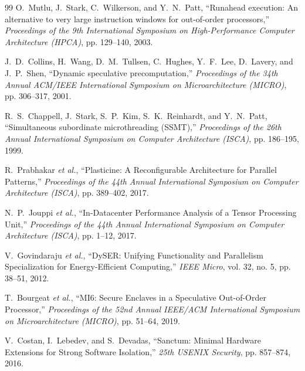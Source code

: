 \documentclass[twocolumn]{article}
\begin{document}
\begin{thebibliography}{99}
O.~Mutlu, J.~Stark, C.~Wilkerson, and Y.~N.~Patt,
``Runahead execution: An alternative to very large instruction windows for out-of-order processors,''
\emph{Proceedings of the 9th International Symposium on High-Performance Computer Architecture (HPCA)}, pp. 129--140, 2003.

J.~D.~Collins, H.~Wang, D.~M.~Tullsen, C.~Hughes, Y.~F.~Lee, D.~Lavery, and J.~P.~Shen,
``Dynamic speculative precomputation,''
\emph{Proceedings of the 34th Annual ACM/IEEE International Symposium on Microarchitecture (MICRO)}, pp. 306--317, 2001.

R.~S.~Chappell, J.~Stark, S.~P.~Kim, S.~K.~Reinhardt, and Y.~N.~Patt,
``Simultaneous subordinate microthreading (SSMT),''
\emph{Proceedings of the 26th Annual International Symposium on Computer Architecture (ISCA)}, pp. 186--195, 1999.

R.~Prabhakar \emph{et al.},
``Plasticine: A Reconfigurable Architecture for Parallel Patterns,''
\emph{Proceedings of the 44th Annual International Symposium on Computer Architecture (ISCA)}, pp. 389--402, 2017.

N.~P.~Jouppi \emph{et al.},
``In-Datacenter Performance Analysis of a Tensor Processing Unit,''
\emph{Proceedings of the 44th Annual International Symposium on Computer Architecture (ISCA)}, pp. 1--12, 2017.

V.~Govindaraju \emph{et al.},
``DySER: Unifying Functionality and Parallelism Specialization for Energy-Efficient Computing,''
\emph{IEEE Micro}, vol. 32, no. 5, pp. 38--51, 2012.

T.~Bourgeat \emph{et al.},
``MI6: Secure Enclaves in a Speculative Out-of-Order Processor,''
\emph{Proceedings of the 52nd Annual IEEE/ACM International Symposium on Microarchitecture (MICRO)}, pp. 51--64, 2019.

V.~Costan, I.~Lebedev, and S.~Devadas,
``Sanctum: Minimal Hardware Extensions for Strong Software Isolation,''
\emph{25th USENIX Security}, pp. 857--874, 2016.


\end{thebibliography}
\end{document}
